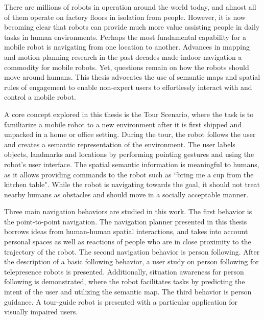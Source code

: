 \begin{summary}

There are millions of robots in operation around the world today, and almost all of them operate on factory floors in isolation from people. However, it is now becoming clear that robots can provide much more value assisting people in daily tasks in human environments. Perhaps the most fundamental capability for a mobile robot is navigating from one location to another. Advances in mapping and motion planning research in the past decades made indoor navigation a commodity for mobile robots. Yet, questions remain on how the robots should move around humans. This thesis advocates the use of semantic maps and spatial rules of engagement to enable non-expert users to effortlessly interact with and control a mobile robot.

A core concept explored in this thesis is the Tour Scenario, where the task is to familiarize a mobile robot to a new environment after it is first shipped and unpacked in a home or office setting. During the tour, the robot follows the user and creates a semantic representation of the environment. The user labels objects, landmarks and locations by performing pointing gestures and using the robot's user interface. The spatial semantic information is meaningful to humans, as it allows providing commands to the robot such as ``bring me a cup from the kitchen table". While the robot is navigating towards the goal, it should not treat nearby humans as obstacles and should move in a socially acceptable manner.

Three main navigation behaviors are studied in this work. The first behavior is the point-to-point navigation. The navigation planner presented in this thesis borrows ideas from human-human spatial interactions, and takes into account personal spaces as well as reactions of people who are in close proximity to the trajectory of the robot. The second navigation behavior is person following. After the description of a basic following behavior, a user study on person following for telepresence robots is presented. Additionally, situation awareness for person following is demonstrated, where the robot facilitates tasks by predicting the intent of the user and utilizing the semantic map. The third behavior is person guidance. A tour-guide robot is presented with a particular application for visually impaired users.

\end{summary}